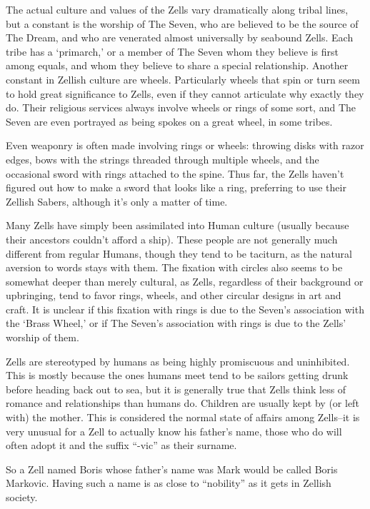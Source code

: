 \documentclass[oneside,11pt,english]{book}
\begin{document}
The actual culture and values of the Zells vary dramatically along tribal lines, but a constant is the 
worship of The Seven, who are believed to be the source of The Dream, and who are venerated almost 
universally by seabound Zells. Each tribe has a ‘primarch,’ or a member of The Seven whom they believe 
is first among equals, and whom they believe to share a special relationship. Another constant in Zellish 
culture are wheels. Particularly wheels that spin or turn seem to hold great significance to Zells, even if 
they cannot articulate why exactly they do. Their religious services always involve wheels or rings of 
some sort, and The Seven are even portrayed as being spokes on a great wheel, in some tribes. 

Even weaponry is often made involving rings or wheels: throwing disks with razor edges, bows with the strings 
threaded through multiple wheels, and the occasional sword with rings attached to the spine. Thus far, the 
Zells haven't figured out how to make a sword that looks like a ring, preferring to use their Zellish Sabers, although it's only a matter of time. 

Many Zells have simply been assimilated into Human culture (usually because their ancestors couldn't 
afford a ship). These people are not generally much different from regular Humans, though they tend to 
be taciturn, as the natural aversion to words stays with them. The fixation with circles also seems to be 
somewhat deeper than merely cultural, as Zells, regardless of their background or upbringing, tend to 
favor rings, wheels, and other circular designs in art and craft. It is unclear if this fixation with rings is 
due to the Seven's association with the ‘Brass Wheel,’ or if The Seven's association with rings is due to 
the Zells' worship of them. 

Zells are stereotyped by humans as being highly promiscuous and uninhibited. This is mostly because the 
ones humans meet tend to be sailors getting drunk before heading back out to sea, but it is generally true 
that Zells think less of romance and relationships than humans do. Children are usually kept by (or left 
with) the mother. This is considered the normal state of affairs among Zells--it is very unusual for a Zell 
to actually know his father’s name, those who do will often adopt it and the suffix “-vic” as their surname. 

So a Zell named Boris whose father’s name was Mark would be called Boris Markovic. Having such a 
name is as close to “nobility” as it gets in Zellish society. 
\end{document}
